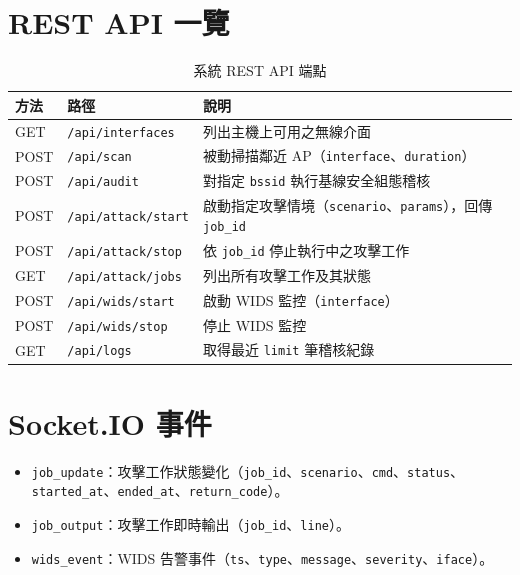 \documentclass[12pt,a4paper,oneside]{report}
\begin{document}
\section{REST API 一覽}
\begin{longtable}{p{}p{}p{}}
\caption{系統 REST API 端點}\\
\toprule
方法 & 路徑 & 說明 \\
\midrule
GET & \texttt{/api/interfaces} & 列出主機上可用之無線介面 \\
POST & \texttt{/api/scan} & 被動掃描鄰近 AP（\texttt{interface}、\texttt{duration}） \\
POST & \texttt{/api/audit} & 對指定 \texttt{bssid} 執行基線安全組態稽核 \\
POST & \texttt{/api/attack/start} & 啟動指定攻擊情境（\texttt{scenario}、\texttt{params}），回傳 \texttt{job\_id} \\
POST & \texttt{/api/attack/stop} & 依 \texttt{job\_id} 停止執行中之攻擊工作 \\
GET & \texttt{/api/attack/jobs} & 列出所有攻擊工作及其狀態 \\
POST & \texttt{/api/wids/start} & 啟動 WIDS 監控（\texttt{interface}） \\
POST & \texttt{/api/wids/stop} & 停止 WIDS 監控 \\
GET & \texttt{/api/logs} & 取得最近 \texttt{limit} 筆稽核紀錄 \\
\bottomrule
\end{longtable}

\section{Socket.IO 事件}
\begin{itemize}
  \item \texttt{job\_update}：攻擊工作狀態變化（\texttt{job\_id}、\texttt{scenario}、\texttt{cmd}、\texttt{status}、\texttt{started\_at}、\texttt{ended\_at}、\texttt{return\_code}）。
  \item \texttt{job\_output}：攻擊工作即時輸出（\texttt{job\_id}、\texttt{line}）。
  \item \texttt{wids\_event}：WIDS 告警事件（\texttt{ts}、\texttt{type}、\texttt{message}、\texttt{severity}、\texttt{iface}）。
\end{itemize}
\end{document}
